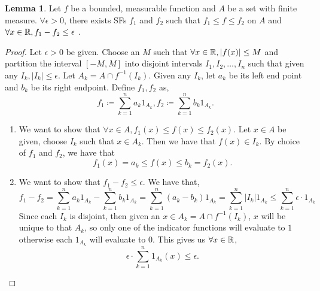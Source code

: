 \documentclass{article}
\theoremstyle{axiom} \newtheorem{axiom}{Axiom}
\theoremstyle{definition} \newtheorem{definition}{Definition}
\theoremstyle{example} \newtheorem{example}{Example}
\theoremstyle{proposition} \newtheorem{prop}{Proposition}
\theoremstyle{lemma} \newtheorem{lemma}{Lemma}
\begin{document}
\begin{lemma}
	Let $f$ be a bounded, measurable function and $A$ be a 
	set with finite measure. $\forall \epsilon > 0$, there exists SFs $f_1$ and $f_2$ such 
	that $f_1\leq f \leq f_2$ on $A$ and $\forall x \in \mathbb{R}, f_1 - f_2 \leq
	\epsilon$ .
\end{lemma}
\begin{proof}
	Let $\epsilon > 0$ be given.
	Choose an $M$ such that $\forall x \in \mathbb{R}, |f(x)| \leq M$ and partition the
	interval $[-M,M]$ into disjoint intervals $I_1,I_2,\ldots,I_n$ such that
	given any $I_k, |I_k| \leq \epsilon$. Let $A_k = A \cap f^{-1}(I_k)$. Given
	any $I_k$, let $a_k$ be its left end point and $b_k$ be its right endpoint.
	Define $f_1, f_2$ as,
	\begin{equation*}
		f_1 \coloneqq \sum^{n}_{k=1} a_k 1_{A_k},
		f_2 \coloneqq \sum^{n}_{k=1} b_k 1_{A_k}.
	\end{equation*}

	\begin{enumerate}
		\item 
		We want to show that $\forall x \in A, f_1(x) \leq f(x) \leq f_2(x)$.
		Let $x \in A$ be given, choose $I_k$ such that $x\in A_k$. Then we have
		that $f(x) \in I_k$. By choice of $f_1$ and $f_2$, we have that 
			\begin{equation*}
				f_1(x) = a_k \leq f(x) \leq b_k = f_2(x).
			\end{equation*}
		\item We want to show that $f_1 - f_2 \leq \epsilon$. We have that,
		\begin{equation*}
			f_1 - f_2 = \sum^{n}_{k=1} a_k 1_{A_k} - \sum^{n}_{k=1} b_k 1_{A_k}
				 =\sum^{n}_{k=1} (a_k - b_k) 1_{A_k}
				 =\sum^{n}_{k=1} |I_k|  1_{A_k}
				 \leq \sum^{n}_{k=1} \epsilon\cdot  1_{A_k}
		\end{equation*}
		Since each $I_k$ is disjoint, then given an $x \in A_k = A\cap f^{-1}(I_k)$,
		$x$ will be unique to that $A_k$, so only one of the indicator
		functions will evaluate to $1$ otherwise each $1_{A_k}$ will evaluate to
		$0$. This gives us $\forall x\in \mathbb{R}$,
		\begin{equation*}
			 \epsilon \cdot \sum^{n}_{k=1}  1_{A_k}(x) \leq \epsilon.
		\end{equation*}
	\end{enumerate}
\end{proof}
\end{document}
